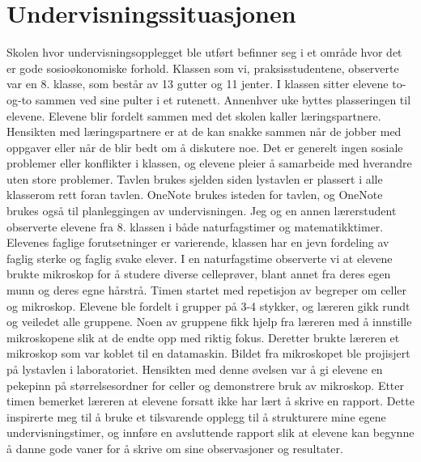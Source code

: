 \documentclass[main.tex]{subfiles}
\begin{document}
\section*{Undervisningssituasjonen}
Skolen hvor undervisningsopplegget ble utført befinner seg i et område hvor det er gode 
sosioøkonomiske forhold. Klassen som vi, praksisstudentene, observerte var en 8. klasse, som består 
av 13 gutter og 11 jenter. I klassen sitter elevene to-og-to sammen ved sine pulter i et rutenett. 
Annenhver uke byttes plasseringen til elevene. Elevene blir fordelt sammen med det skolen kaller 
læringspartnere. Hensikten med læringspartnere er at de kan snakke sammen når de jobber med oppgaver 
eller når de blir bedt om å diskutere noe.  Det er generelt ingen sosiale problemer 
eller konflikter i klassen, og elevene pleier å samarbeide med hverandre uten store problemer. Tavlen 
brukes sjelden siden lystavlen er plassert i alle klasserom rett foran tavlen. OneNote brukes isteden 
for tavlen, og OneNote brukes også til planleggingen av undervisningen.
\newline
\newline
Jeg og en annen lærerstudent observerte elevene fra 8. klassen i både naturfagstimer og 
matematikktimer. Elevenes faglige forutsetninger er varierende, klassen har en jevn fordeling av 
faglig sterke og faglig svake elever. I en naturfagstime observerte vi at elevene brukte mikroskop 
for å studere diverse celleprøver, blant annet fra deres egen munn og deres egne hårstrå. Timen 
startet med repetisjon av begreper om celler og mikroskop. Elevene ble fordelt i grupper på 3-4 
stykker, og læreren gikk rundt og veiledet alle gruppene. Noen av gruppene fikk 
hjelp fra læreren med å innstille mikroskopene slik at de endte opp med riktig fokus. Deretter brukte 
læreren et mikroskop som var koblet til en datamaskin. Bildet fra mikroskopet ble projisjert på 
lystavlen i laboratoriet. Hensikten med denne øvelsen var å gi elevene en pekepinn på 
størrelsesordner for celler og demonstrere bruk av mikroskop. Etter timen bemerket læreren at 
elevene forsatt ikke har lært å skrive en rapport. Dette inspirerte meg til å bruke et tilsvarende 
opplegg til å strukturere mine egene undervisningstimer, og innføre en avsluttende rapport 
slik at elevene kan begynne å danne gode vaner for å skrive om sine observasjoner og resultater.
\end{document}
